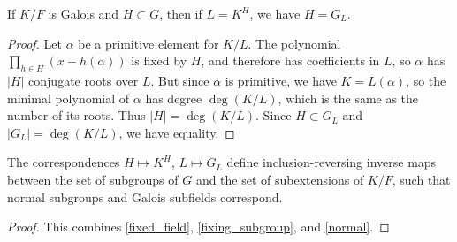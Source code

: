 \begin{corollary}
 If $K/F$ is Galois and $H \subset G$, then if $L = K^H$, we have $H = G_L$.
 \label{fixing_subgroup}
\end{corollary}

\begin{proof}
 Let $\alpha$ be a primitive element for $K/L$.  The polynomial $\prod_{h \in H} (x - h(\alpha))$ is fixed by $H$, and therefore has coefficients in $L$, so $\alpha$ has $|H|$ conjugate roots over $L$.  But since $\alpha$ is primitive, we have $K = L(\alpha)$, so the minimal polynomial of $\alpha$ has degree $\deg(K/L)$, which is the same as the number of its roots.  Thus $|H| = \deg(K/L)$.  Since $H \subset G_L$ and $|G_L| = \deg(K/L)$, we have equality.
\end{proof}


\begin{theorem} The correspondences $H \mapsto K^H$, $L \mapsto G_L$ define
inclusion-reversing inverse maps between the set of subgroups of $G$ and the
set of subextensions of $K/F$, such that normal subgroups and Galois subfields
correspond.
\label{fundamental_theorem}
\end{theorem}

\begin{proof} This combines \cref{fixed_field}, \cref{fixing_subgroup}, and \cref{normal}.
\end{proof}


